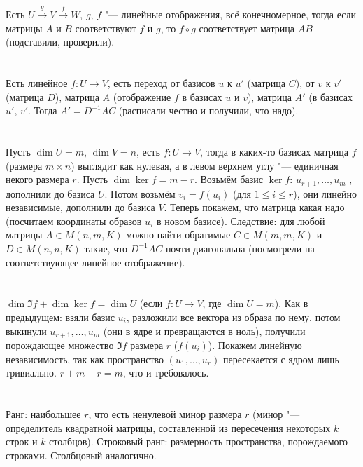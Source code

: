 \section{} %
Есть $U \stackrel{g}{\to} V \stackrel{f}{\to}W$, $g$, $f$ "--- линейные отображения, всё конечномерное, тогда если матрицы $A$ и $B$ соответствуют $f$ и $g$,
то $f \circ g$ соответствует матрица $AB$ (подставили, проверили).

\section{} %
Есть линейное $f \colon U \to V$, есть переход от базисов $u$ к $u'$ (матрица $C$), от $v$ к $v'$ (матрица $D$),
матрица $A$ (отображение $f$ в базисах $u$ и $v$), матрица $A'$ (в базисах $u'$, $v'$.
Тогда $A'=D^{-1}AC$ (расписали честно и получили, что надо).

\section{} %
Пусть $\dim U = m$, $\dim V = n$, есть $f \colon U \to V$, тогда в каких-то базисах матрица $f$ (размера $m \times n$) выглядит как нулевая, а в левом верхнем углу "--- единичная некого размера $r$.
Пусть $\dim \ker f = m - r$.
Возьмём базис $\ker f$: $u_{r+1}, \dots, u_m$ , дополнили до базиса $U$.
Потом возьмём $v_i=f(u_i)$ (для $1 \le i \le r$), они линейно независимые, дополнили до базиса $V$.
Теперь покажем, что матрица какая надо (посчитаем координаты образов $u_i$ в новом базисе).
Следствие: для любой матрицы $A\in M(n,m,K)$ можно найти обратимые $C \in M(m,m,K)$ и $D\in M(n,n,K)$ такие, что $D^{-1}AC$ почти диагональна (посмотрели на соответствующее линейное отображение).

\section{} %
$\dim \Im f + \dim \ker f = \dim U$ (если $f \colon U \to V$, где $\dim U = m$).
Как в предыдущем: взяли базис $u_i$, разложили все вектора из образа по нему, потом выкинули $u_{r+1}, \dots, u_m$ (они в ядре и превращаются в ноль),
получили порождающее множество $\Im f$ размера $r$ ($f(u_i)$).
Покажем линейную независимость, так как пространство $(u_1, \dots, u_r)$ пересекается с ядром лишь тривиально.
$r + m - r = m$, что и требовалось.

\section{} %
Ранг: наибольшее $r$, что есть ненулевой минор размера $r$ (минор "--- определитель квадратной матрицы, составленной из пересечения некоторых $k$ строк и $k$ столбцов).
Строковый ранг: размерность пространства, порождаемого строками.
Столбцовый аналогично.

